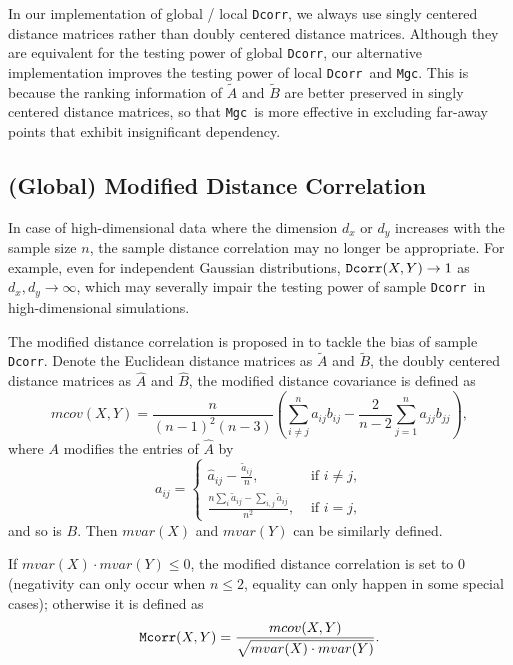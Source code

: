 \documentclass[11pt]{article}
\providecommand{\sct}[1]{{\sc \texttt{#1}}}
\newcommand{\Mgc}{\sct{Mgc}}
\newcommand{\Dcorr}{\sct{Dcorr}}
\newcommand{\Mcorr}{\sct{Mcorr}}
\begin{document}
In our implementation of global / local \Dcorr, we always use singly centered distance matrices rather than doubly centered distance matrices. Although they are equivalent for the testing power of global \Dcorr, our alternative implementation improves the testing power of local \Dcorr~and \Mgc. This is because the ranking information of $\tilde{A}$ and $\tilde{B}$ are better preserved in singly centered distance matrices, so that \Mgc~is more effective in excluding far-away points that exhibit insignificant dependency.

\subsection{(Global) Modified Distance Correlation}
\label{appen:mcorr}
In case of high-dimensional data where the dimension $d_{x}$ or $d_{y}$ increases with the sample size $n$, the sample distance correlation may no longer be appropriate. For example, even for independent Gaussian distributions, $\Dcorr(X,Y) \rightarrow 1$ as $d_{x}, d_{y} \rightarrow \infty$, which may severally impair the testing power of sample \Dcorr~in high-dimensional simulations.

The modified distance correlation is proposed in \cite{SzekelyRizzo2013a} to tackle the bias of sample \Dcorr. Denote the Euclidean distance matrices as $\tilde{A}$ and $\tilde{B}$, the doubly centered distance matrices as $\hat{A}$ and $\hat{B}$, the modified distance covariance is defined as
\begin{equation}
\label{mcovEqu}
mcov(X,Y)=\frac{n}{(n-1)^2(n-3)}(\sum_{i \neq j}^{n}a_{ij}b_{ij}-\frac{2}{n-2}\sum_{j=1}^{n}a_{jj}b_{jj}),
\end{equation}
where $A$ modifies the entries of $\hat{A}$ by
\[a_{ij} = \left\{
  \begin{array}{lr}
    \hat{a}_{ij}-\frac{\tilde{a}_{ij}}{n}, & \mbox{ if } i \neq j, \\
    \frac{n\sum_{i}\tilde{a}_{ij}-\sum_{i,j}\tilde{a}_{ij}}{n^2}, &\mbox{ if } i = j,
  \end{array}
\right.
\]
and so is $B$. Then $mvar(X)$ and $mvar(Y)$ can be similarly defined. 

If $mvar(X) \cdot mvar(Y) \leq 0$, the modified distance correlation is set to $0$ (negativity can only occur when $n\leq 2$, equality can only happen in some special cases); otherwise it is defined as
\begin{equation}
\label{mcorrEqu}
\Mcorr(X,Y)=\frac{mcov(X,Y)}{\sqrt{mvar(X) \cdot mvar(Y)}}.
\end{equation}
\end{document}
